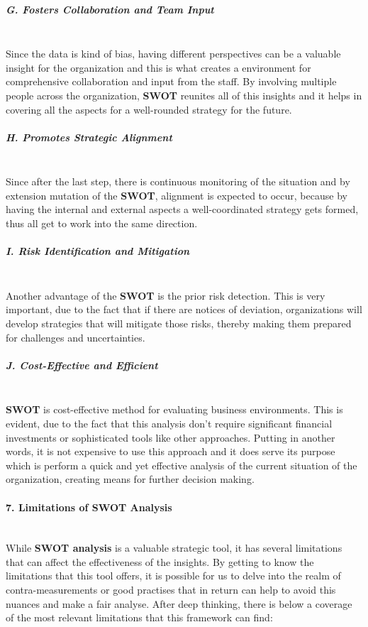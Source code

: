 \subparagraph{G. Fosters Collaboration and Team Input}\mbox{}\\
Since the data is kind of bias, having different perspectives can be a valuable insight for the organization and this is what creates a environment for comprehensive collaboration and input from the staff. By involving multiple people across the organization, \textbf{SWOT} reunites all of this insights and it helps in covering all the aspects for a well-rounded strategy for the future.

\subparagraph{H. Promotes Strategic Alignment}\mbox{}\\
Since after the last step, there is continuous monitoring of the situation and by extension mutation of the \textbf{SWOT}, alignment is expected to occur, because by having the internal and external aspects a well-coordinated strategy gets formed,  thus all get to work into the same direction.

\subparagraph{I. Risk Identification and Mitigation}\mbox{}\\
Another advantage of the \textbf{SWOT} is the prior risk detection. This is very important, due to the fact that if there are notices of deviation, organizations will develop strategies that will mitigate those risks, thereby making them prepared for challenges and uncertainties.

\subparagraph{J. Cost-Effective and Efficient}\mbox{}\\
\textbf{SWOT} is cost-effective method for evaluating business environments. This is evident, due to the fact that this analysis don't require significant financial investments or sophisticated tools like other approaches. Putting in another words, it is not expensive to use this approach and it does serve its purpose which is perform a quick and yet effective analysis of the current situation of the organization, creating means for further decision making.

\paragraph{7. Limitations of SWOT Analysis}\mbox{}\\
While \textbf{SWOT analysis} is a valuable strategic tool, it has several limitations that can affect the effectiveness of the insights. By getting to know the limitations that this tool offers, it is possible for us to delve into the realm of contra-measurements or good practises that in return can help to avoid this nuances and make a fair analyse. After deep thinking, there is below a coverage of the most relevant limitations that this framework can find:

